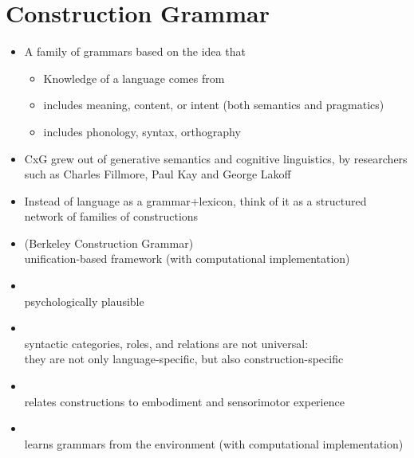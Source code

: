 \documentclass[a4paper,landscape,headrule,footrule]{foils}
\begin{document}
\maketitle




\overview
{}

\section[Construction grammar: the same analyses in a different system; the family, and how SBCG differs from HPSG]{Construction Grammar}


\begin{itemize}
\item A family of grammars based on the idea that
  \begin{itemize}
  \item Knowledge of a language comes from 
  \item {} includes meaning, content, or intent 
    (both semantics and pragmatics)
  \item {} includes phonology, syntax, orthography
  \end{itemize}
\item CxG grew out of generative semantics and cognitive linguistics,
  by researchers such as Charles Fillmore, Paul Kay and George Lakoff
\item Instead of language as a grammar+lexicon, think of it as a
  structured network of families of constructions
\end{itemize}

\begin{itemize}
\item {} (Berkeley Construction Grammar)
  \\  unification-based framework (with computational implementation)
\item {}
  \\ psychologically plausible
\item {}
  \\ syntactic categories, roles, and relations are not universal: 
  \\ they are not only language-specific, but also construction-specific 
\item {}
  \\ relates constructions to embodiment and sensorimotor experience
\item {}
  \\ learns grammars from the environment (with computational implementation)
\end{itemize}
\end{document}
